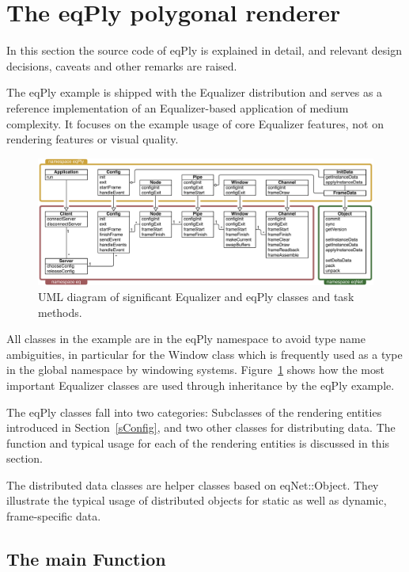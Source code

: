 \documentclass[10pt,a4]{scrartcl}
\newcommand{\fig}[1]{Figure~\ref{#1}}
\newcommand{\sref}[1]{Section~\ref{#1}}
\begin{document}
\section{\label{sEqPly}The eqPly polygonal renderer}

In this section the source code of \textsf{eqPly} is explained in
detail, and relevant design decisions, caveats and other remarks are
raised.

The \textsf{eqPly} example is shipped with the Equalizer distribution
and serves as a reference implementation of an Equalizer-based
application of medium complexity. It focuses on the example usage of
core Equalizer features, not on rendering features or visual quality.

\begin{figure}[ht!]\center
  \includegraphics[width=\textwidth]{images/uml}
  {\caption{\small\label{fUml}UML diagram of significant Equalizer and
      eqPly classes and task methods.}}
\end{figure}

All classes in the example are in the \textsf{eqPly} namespace to avoid
type name ambiguities, in particular for the \textsf{Window} class which
is frequently used as a type in the global namespace by windowing
systems. \fig{fUml} shows how the most important Equalizer classes are
used through inheritance by the \textsf{eqPly} example.

The \textsf{eqPly} classes fall into two categories: Subclasses of the
rendering entities introduced in \sref{sConfig}, and two other classes
for distributing data. The function and typical usage for each of the
rendering entities is discussed in this section. 

The distributed data classes are helper classes based on
\textsf{eqNet::Object}. They illustrate the typical usage of distributed
objects for static as well as dynamic, frame-specific data.


\subsection{The main Function}
\end{document}

